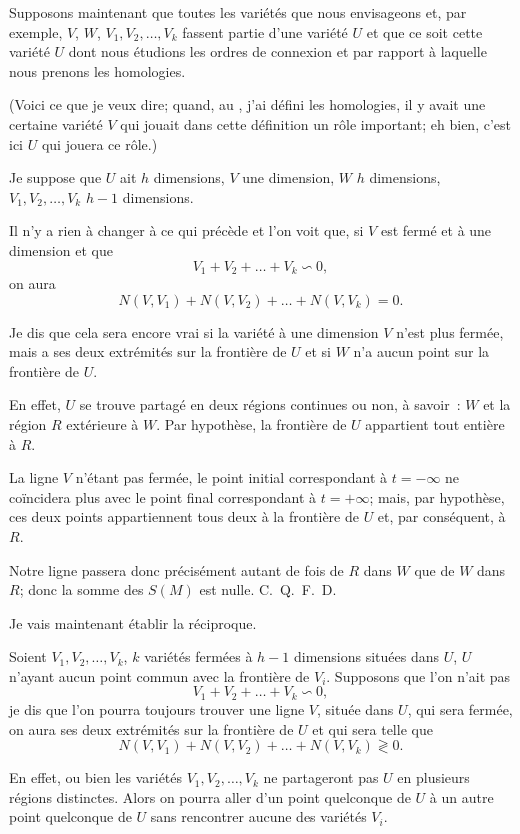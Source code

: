 \documentclass{article}
\begin{document}
Supposons maintenant que toutes les variétés que nous envisageons et, par exemple, $V$, $W$, $V_{1}, V_{2}, \ldots, V_{k}$ fassent partie d'une variété $U$ et que ce soit cette variété $U$ dont nous étudions les ordres de connexion et par rapport à laquelle nous prenons les homologies.

(Voici ce que je veux dire; quand, au , j'ai défini les homologies, il y avait une certaine variété $V$ qui jouait dans cette définition un rôle important; eh bien, c'est ici $U$ qui jouera ce rôle.)

Je suppose que $U$ ait $h$ dimensions, $V$ une dimension, $W$ $h$ dimensions, $V_{1}, V_{2}, \ldots, V_{k}$ $h-1$ dimensions.

Il n'y a rien à changer à ce qui précède et l'on voit que, si $V$ est fermé et à une dimension et que
\[
V_{1} + V_{2} + \ldots + V_{k} \backsim 0,
\]
on aura
\[
N(V, V_{1}) + N(V, V_{2}) + \ldots + N(V, V_{k}) = 0.
\]

Je dis que cela sera encore vrai si la variété à une dimension $V$ n'est plus fermée, mais a ses deux extrémités sur la frontière de $U$ et si $W$ n'a aucun point sur la frontière de $U$.

En effet, $U$ se trouve partagé en deux régions continues ou non, à savoir~: $W$ et la région $R$ extérieure à $W$. Par hypothèse, la frontière de $U$ appartient tout entière à $R$.

La ligne $V$ n'étant pas fermée, le point initial correspondant à $t = -\infty$ ne coïncidera plus avec le point final correspondant à $t = +\infty$; mais,
par hypothèse, ces deux points appartiennent tous deux à la frontière de $U$ et, par conséquent, à $R$.

Notre ligne passera donc précisément autant de fois de $R$ dans $W$ que de $W$ dans $R$; donc la somme des $S(M)$ est nulle. C.~Q.~F.~D.

Je vais maintenant établir la réciproque.

Soient $V_{1}, V_{2}, \ldots, V_{k}$, $k$ variétés fermées à $h-1$ dimensions situées dans $U$, $U$ n'ayant aucun point commun avec la frontière de $V_{i}$. Supposons que l'on n'ait pas
\[
V_{1} + V_{2} + \ldots + V_{k} \backsim 0,
\]
je dis que l'on pourra toujours trouver une ligne $V$, située dans $U$, qui sera fermée, on aura ses deux extrémités sur la frontière de $U$ et qui sera telle que
\[
N(V, V_{1}) + N(V, V_{2}) + \ldots + N(V, V_{k}) \gtrless 0.
\]

En effet, ou bien les variétés $V_{1}, V_{2}, \ldots, V_{k}$ ne partageront pas $U$ en plusieurs régions distinctes. Alors on pourra aller d'un point quelconque de $U$ à un autre point quelconque de $U$ sans rencontrer aucune des variétés $V_{i}$.
\end{document}
